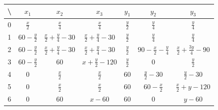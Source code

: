 \begin{tabular}{|c||c|c|c||c|c|c|}
	\hline
	\textbackslash 
	&	$x_1$&			$x_2$&						$x_3$&						$y_1$&			$y_2$&						$y_3$ \\
	\hline
	\hline
	0&	$\frac{x}2$&	$\frac{x}4$&				$\frac{x}4$&				$\frac{y}2$&	$\frac{y}4$&				$\frac{y}4$	  \\
	\hline
	\hline
	1&	$60-\frac{y}2$&	$\frac{x}2+\frac{y}4-30$&	$\frac{x}2+\frac{y}4-30$&	$\frac{y}2$&	$\frac{y}4$&				$\frac{y}4$	  \\
	\hline
	2&	$60-\frac{y}2$&	$\frac{x}2+\frac{y}4-30$&	$\frac{x}2+\frac{y}4-30$&	$\frac{y}2$&	$90-\frac{x}2-\frac{y}4$&	$\frac{x}2+\frac{3y}4-90$	  \\
	\hline
	\hline
	3&	$60-\frac{y}2$&	$60$&						$x+\frac{y}2-120$&			$\frac{y}2$&	$0$&						$\frac{y}2$	  \\
	\hline
	\hline
	4&	$0$&			$\frac{x}2$&				$\frac{x}2$&				$60$&			$\frac{y}2-30$&				$\frac{y}2-30$	  \\
	\hline
	5&	$0$&			$\frac{x}2$&				$\frac{x}2$&				$60$&			$60-\frac{x}2$&				$\frac{x}2+y-120$	  \\
	\hline
	\hline
	6&	$0$&			$60$&						$x-60$&						$60$&			$0$&						$y-60$	  \\
	\hline
\end{tabular}












